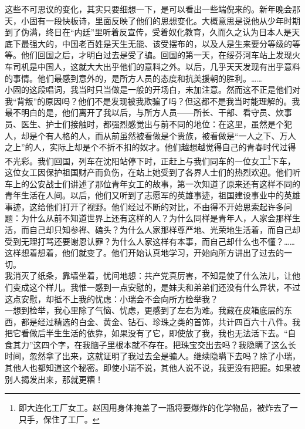 这些不可思议的变化，其实只要细想一下，是可以看出一些端倪来的。新年晚会那天，小固有一段快板诗，里面反映了他们的思想变化。大概意思是说他从少年时期到了伪满，终日在“内廷”里听着反宣传，受着奴化教育，久而久之认为日本人是天底下最强大的，中国老百姓是天生无能、该受摆布的，以及人是生来要分等级的等等。他们回国之后，才明白过去是受了骗。回国的第一天，在绥芬河车站上发现火车司机是中国人，这就大大出乎他们的意料之外。以后，几乎天天发现有出乎意料的事情。他们最感到意外的，是所方人员的态度和抗美援朝的胜利。……\\

小固的这段唱词，我当时只当做是一般的开场白，未加注意。然而这不正是他们对我“背叛”的原因吗？他们不是发现被我欺骗了吗？但这都不是我当时能理解的。我最不明白的是，他们离开了我以后，与所方人员——所长、干部、看守员、炊事员、医生、护士们接触时，都强烈感觉出与前不同的地位：在这里，虽然是个犯人，却是个有人格的人，而从前虽然被看做是个贵族，被看做是“一人之下、万人之上”的人，实际上却是个不折不扣的奴才。他们越想越觉得自己的青春时代过得不光彩。我们回国，列车在沈阳站停下时，正赶上与我们同车的一位女工\footnote{即大连化工厂女工。赵因用身体掩盖了一瓶将要爆炸的化学物品，被炸去了一只手，保住了工厂。}下车，这位女工因保护祖国财产而负伤，在站上她受到了各界人士们的热烈欢迎。他们听车上的公安战士们讲述了那位青年女工的故事，第一次知道了原来还有这样不同的青年生活在人间。以后，他们又听到了志愿军的英雄事迹，祖国建设事业中的英雄事迹，这给他们打开了视野。他们经过不断的对比，不由得不开始思索起许多问题：为什么从前不知道世界上还有这样的人？为什么同样是青年人，人家会那样生活，而自己却只知参禅、磕头？为什么人家那样尊严地、光荣地生活着，而自己却受到无理打骂还要谢恩认罪？为什么人家这样有本事，而自己却什么也不懂？……\\

这样想着想着，他们就变了。他们开始认真地学习，开始向所方讲出了过去的一切。\\

我消灭了纸条，靠墙坐着，忧间地想：共产党真厉害，不知是使了什么法儿，让他们变成这个样儿。我惟一感到一点安慰的，是妹夫和弟弟们还没有什么异状，不过这点安慰，却抵不上我的忧虑：小瑞会不会向所方检举我？\\

一想到检举，我心里除了气恼、忧虑，更感到了左右为难。我藏在皮箱底层的东西，都是经过精选的白金、黄金、钻石、珍珠之类的首饰，共计四百六十八件。我把它看做后半生生活的依靠，如果没有了它，即使放了我，我也无法活下去。“自食其力”这四个字，在我脑子里根本就不存在。把珠宝交出去吗？我隐瞒了这么长时间，忽然拿了出来，这就证明了我过去全是骗人。继续隐瞒下去吗？除了小瑞，其他人也都知道这个秘密。即使小瑞不说，其他人说不说，我更没有把握。如果被别人揭发出来，那就更糟！\\

